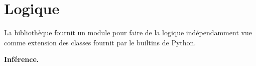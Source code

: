 \chapter{Logique}
La bibliothèque fournit un module pour faire de la logique indépendamment vue comme extension des classes fournit par le builtins de Python.

\begin{flushleft}
\textbf{Inférence.}
\begin{python}
 
\end{python}
\end{flushleft}
